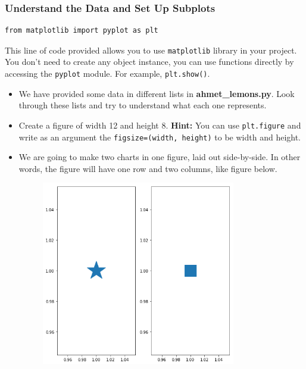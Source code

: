 \documentclass[a4paper]{article}
\begin{document}
\subsubsection{Understand the Data and Set Up Subplots}
\label{themeMethod}
\begin{lstlisting}
from matplotlib import pyplot as plt
\end{lstlisting}{}
This line of code provided allows you to use \texttt{matplotlib} library in your project. You don't need to create any object instance, you can use functions directly by accessing the \texttt{pyplot} module. For example, \texttt{plt.show()}.
\newline
\begin{itemize}
\item
We have provided some data in different lists in  \textbf{ahmet\_lemons.py}. Look through these lists and try to understand what each one represents.

\item
Create a figure of width 12 and height 8. \newline
\textbf{Hint:} You can use \texttt{plt.figure} and write as an argument the \texttt{figsize=(width, height)} to be width and height.

\item
We are going to make two charts in one figure, laid out side-by-side. In other words, the figure will have one row and two columns, like figure below.
\begin{figure}[!htb]
\centering
\includegraphics[width=0.8\textwidth]{side_by_side_subplot.png}
\end{figure}


\end{itemize}
\end{document}
